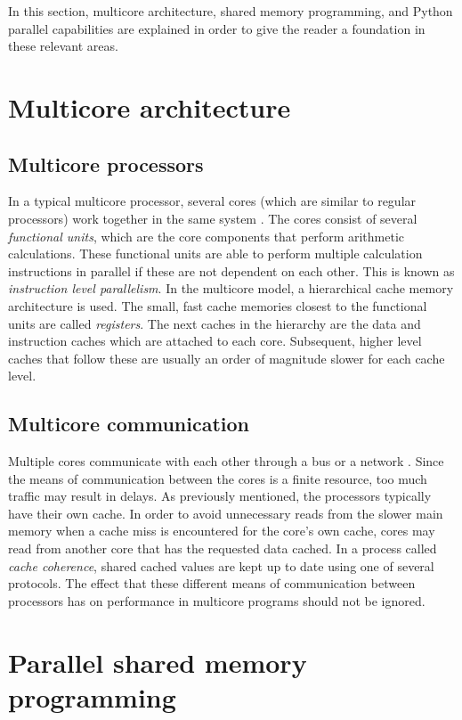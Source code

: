 In this section, multicore architecture, shared memory programming, and Python parallel capabilities are explained in order
to give the reader a foundation in these relevant areas.

\section{Multicore architecture}

\subsection{Multicore processors}
In a typical multicore processor, several cores (which are similar to regular processors) work together in the
same system \cite[p. 44-50]{mccool_2012_structured_spppfec}. The cores consist of several \textit{functional units},
which are the core components that perform arithmetic calculations. These functional units are able to perform multiple calculation
instructions in parallel if these are not dependent on each other. This is known as \textit{instruction level parallelism}. In the multicore model,
a hierarchical cache memory architecture is used. The small, fast cache memories closest to the functional units are called \textit{registers}.
The next caches in the hierarchy are the data and instruction caches which are attached to each core. Subsequent, higher level caches that follow
these are usually an order of magnitude slower for each cache level.

\subsection{Multicore communication}
Multiple cores communicate with each other through a bus or a network \cite[p. 472-476]{herlihy_2012_art_taomprr}. Since the
means of communication between the cores is a finite resource, too much traffic may result in delays. As previously mentioned, the processors typically
have their own cache. In order to avoid unnecessary reads from the slower main memory when a cache miss is encountered for the core's own cache,
cores may read from another core that has the requested data cached. In a process called \textit{cache coherence}, shared cached values are kept up to date using one
of several protocols. The effect that these different means of communication between processors has on performance in
multicore programs should not be ignored.

\section{Parallel shared memory programming}

